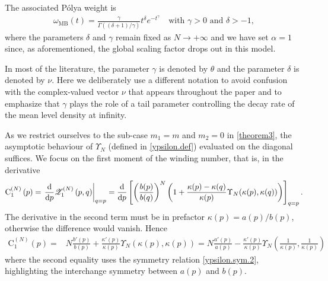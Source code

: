 \documentclass[pdflatex,sn-mathphys-num]{sn-jnl}
\theoremstyle{thmstyleone}
\numberwithin{equation}{section}
\newcommand{\Cc}{\mathrm{C}}
\begin{document}
The associated P\'olya weight is
\begin{align}\label{MB.setup}
    \omega_{\mathrm{MB}}\left(t\right)=\frac{\gamma}{\Gamma((\delta+1)/\gamma)}t^{\delta}e^{-t^{\gamma}}\quad \text{with } \gamma>0 \text{ and } \delta>-1, 
\end{align}
where the parameters $\delta$ and $\gamma$ remain fixed as $N\to+\infty$ and we have set $\alpha=1$ since, as aforementioned, the global scaling factor drops out in this model.


In most of the literature, the parameter $\gamma$ is denoted by $\theta$ and the parameter $\delta$ is denoted by $\nu$. Here we deliberately use a different notation to avoid confusion with the complex-valued vector $\nu$ that appears throughout the paper and to emphasize that $\gamma$ plays the role of a tail parameter controlling the decay rate of the mean level density at infinity.


As we restrict ourselves to the sub-case $m_1=m$ and $m_2=0$ in \autoref{theorem3}, the asymptotic behaviour of $\Upsilon_{N}$ (defined in \eqref{ypsilon.def}) evaluated on the diagonal suffices. We focus on the first moment of the winding number, that is, in the derivative
\begin{equation}
    \Cc^{\left ( N \right )}_{1}\left ( p \right )=\left.\frac{\mathrm{d}}{\mathrm{d}p} \mathscr{Z}^{\left(N\right)}_{\mathrm{1}}\left(p,q\right) \right|_{q=p}=\frac{{\rm d}}{{\rm d}p}\left[\left(\frac{b(p)}{b(q)}\right)^N\biggl(1+\frac{\kappa(p)-\kappa(q)}{\kappa(p)}\Upsilon_N(\kappa(p),\kappa(q))\biggl)\right]_{q=p}.
\end{equation}
The derivative in the second term must be in prefactor $\kappa(p)=a(p)/b(p)$, otherwise the difference would vanish. Hence
\begin{equation}
\begin{split}\label{C1.expl.1}
    \Cc_1^{(N)}(p)=&N\frac{b'(p)}{b(p)}+\frac{\kappa'(p)}{\kappa(p)}\Upsilon_N(\kappa(p),\kappa(p))=N\frac{a'(p)}{a(p)}-\frac{\kappa'(p)}{\kappa(p)}\Upsilon_N\left(\frac{1}{\kappa(p)},\frac{1}{\kappa(p)}\right)
\end{split}
\end{equation}
where the second equality uses the symmetry relation \eqref{ypsilon.sym.2}, highlighting the interchange symmetry between $a(p)$ and $b(p)$.
\end{document}
